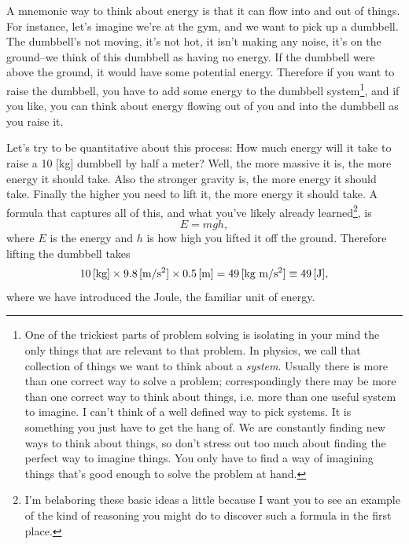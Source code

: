 A mnemonic way to think about energy is that it can flow into and out of things. 
For instance, let’s imagine we’re at the gym, and we want to pick up a dumbbell.
The dumbbell’s not moving, it’s not hot, it isn’t making any noise, it’s on the
ground--we think of this dumbbell as having no energy. If the dumbbell were above the
ground, it would have some potential energy. Therefore if you want to raise the
dumbbell, you have to add some energy to the dumbbell 
system\footnote{One of the trickiest parts of problem solving is isolating in
your mind the only things that are relevant to that problem. In physics, we call
that collection of things we want to think about a {\it system}. 
Usually there is more
than one correct way to solve a problem; correspondingly there may be more than
one correct way to think about things, i.e. more than one useful system to
imagine. I can’t think of a well defined way to pick systems. It is something
you just have to get the hang of. We are constantly finding new ways to think
about things, so don’t stress out too much about finding the perfect way to
imagine things. You only have to find a way of imagining things that’s good
enough to solve the problem at hand.}, and if you like, you can think about energy 
flowing out of you and into the dumbbell as you raise it.

Let’s try to be quantitative about this process: How much energy will it take to
raise a 10 [kg] dumbbell by half a meter? Well, the more massive it is, the
more energy it should take. Also the stronger gravity is, the more energy it should
take. Finally the higher you need to lift it, the more energy it should take. A
formula that captures all of this, and what you've likely already
learned\footnote{I'm belaboring these basic ideas a little because I want you to
see an example of the kind of reasoning you might do to discover such a formula
in the first place.}, is 
\begin{equation}\label{eq:gravpot}
E=mgh,
\end{equation}
where $E$ is the energy and $h$ is how high you lifted it off the ground.
Therefore lifting the dumbbell takes
\begin{equation}
10\,[\text{kg}]\times9.8\,[\text{m/s$^2$}]\times0.5\,[\text{m}]=49\,[\text{kg~m/s$^2$}]\equiv49\,[\text{J}],
\end{equation}
where we have introduced the Joule, the familiar unit of energy.

